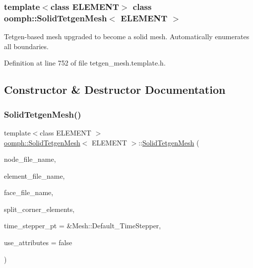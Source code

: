 \subsubsection*{template$<$class E\+L\+E\+M\+E\+NT$>$\newline
class oomph\+::\+Solid\+Tetgen\+Mesh$<$ E\+L\+E\+M\+E\+N\+T $>$}

Tetgen-\/based mesh upgraded to become a solid mesh. Automatically enumerates all boundaries. 

Definition at line 752 of file tetgen\+\_\+mesh.\+template.\+h.



\subsection{Constructor \& Destructor Documentation}
\mbox{\label{classoomph_1_1SolidTetgenMesh_a0672182524354abfccbbd85007753bbe}} 
\subsubsection{\texorpdfstring{Solid\+Tetgen\+Mesh()}{SolidTetgenMesh()}\hspace{0.1cm}{\footnotesize\ttfamily [1/2]}}
{\footnotesize\ttfamily template$<$class E\+L\+E\+M\+E\+NT $>$ \\
\hyperlink{classoomph_1_1SolidTetgenMesh}{oomph\+::\+Solid\+Tetgen\+Mesh}$<$ E\+L\+E\+M\+E\+NT $>$\+::\hyperlink{classoomph_1_1SolidTetgenMesh}{Solid\+Tetgen\+Mesh} (\begin{DoxyParamCaption}\item[{const std\+::string \&}]{node\+\_\+file\+\_\+name,  }\item[{const std\+::string \&}]{element\+\_\+file\+\_\+name,  }\item[{const std\+::string \&}]{face\+\_\+file\+\_\+name,  }\item[{const bool \&}]{split\+\_\+corner\+\_\+elements,  }\item[{Time\+Stepper $\ast$}]{time\+\_\+stepper\+\_\+pt = {\ttfamily \&Mesh\+:\+:Default\+\_\+TimeStepper},  }\item[{const bool \&}]{use\+\_\+attributes = {\ttfamily false} }\end{DoxyParamCaption})\hspace{0.3cm}{\ttfamily [inline]}}



